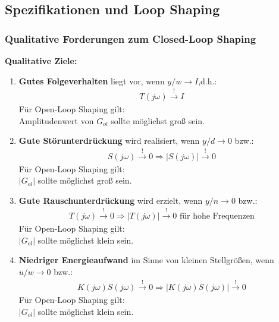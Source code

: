 \documentclass[a4paper,twocolumn,10pt]{article}
\begin{document}
\subsection{Spezifikationen und Loop Shaping}
\subsubsection{Qualitative Forderungen zum Closed-Loop Shaping}
\textbf{Qualitative Ziele:}
\begin{enumerate}[label=$\bullet$]
\item \textbf{Gutes Folgeverhalten} liegt vor, wenn $y/w\rightarrow I$,d.h.:
\begin{align*}
T(j\omega)\overset{!}{\rightarrow}I
\end{align*}
Für Open-Loop Shaping gilt:\\
Amplitudenwert von $G_{ol}$ sollte möglichst groß sein.
\item \textbf{Gute Störunterdrückung} wird realisiert, wenn $y/d\rightarrow 0$ bzw.:
\begin{align*}
S(j\omega)\overset{!}{\rightarrow}0\Rightarrow|S(j\omega)|\overset{!}{\rightarrow}0
\end{align*}
Für Open-Loop Shaping gilt:\\
$|G_{ol}|$ sollte möglichst groß sein.
\item \textbf{Gute Rauschunterdrückung} wird erzielt, wenn $y/n\rightarrow 0$ bzw.:
\begin{align*}
T(j\omega)\overset{!}{\rightarrow}0\Rightarrow |T(j\omega)|\overset{!}{\rightarrow}0\text{ für hohe Frequenzen}
\end{align*}
Für Open-Loop Shaping gilt:\\
$|G_{ol}|$ sollte möglichst klein sein.
\item \textbf{Niedriger Energieaufwand} im Sinne von kleinen Stellgrößen, wenn $u/w\rightarrow 0$ bzw.:
\begin{align*}
K(j\omega)S(j\omega)\overset{!}{\rightarrow}0\Rightarrow |K(j\omega)S(j\omega)|\overset{!}{\rightarrow}0
\end{align*}
Für Open-Loop Shaping gilt:\\
$|G_{ol}|$ sollte möglichst klein sein.
\end{enumerate}
\end{document}
